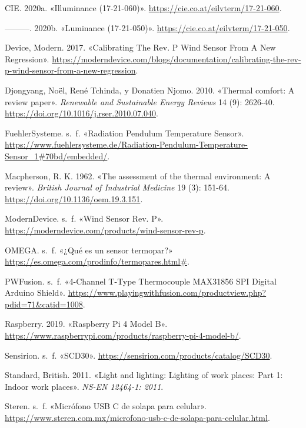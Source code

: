 \documentclass[
  letterpaper,
]{scrbook}
\newlength{\cslhangindent}
\newenvironment{CSLReferences}[2] %
 {\begin{list}{}{%
  \setlength{\itemindent}{0pt}
  \setlength{\leftmargin}{0pt}
  \setlength{\parsep}{0pt}
  \ifodd #1
   \setlength{\leftmargin}{\cslhangindent}
   \setlength{\itemindent}{-1\cslhangindent}
  \fi
  \setlength{\itemsep}{#2\baselineskip}}}
 {\end{list}}
\begin{document}
\begin{CSLReferences}{1}{0}
CIE. 2020a. {«Illuminance (17-21-060)»}.
\url{https://cie.co.at/eilvterm/17-21-060}.

---------. 2020b. {«Luminance (17-21-050)»}.
\url{https://cie.co.at/eilvterm/17-21-050}.

Device, Modern. 2017. {«Calibrating The Rev. P Wind Sensor From A New
Regression»}.
\url{https://moderndevice.com/blogs/documentation/calibrating-the-rev-p-wind-sensor-from-a-new-regression}.

Djongyang, Noël, René Tchinda, y Donatien Njomo. 2010. {«Thermal
comfort: A review paper»}. \emph{Renewable and Sustainable Energy
Reviews} 14 (9): 2626-40.
\url{https://doi.org/10.1016/j.rser.2010.07.040}.

FuehlerSysteme. s.~f. {«Radiation Pendulum Temperature Sensor»}.
\url{https://www.fuehlersysteme.de/Radiation-Pendulum-Temperature-Sensor_1\#70bd/embedded/}.

Macpherson, R. K. 1962. {«The assessment of the thermal environment: A
review»}. \emph{British Journal of Industrial Medicine} 19 (3): 151-64.
\url{https://doi.org/10.1136/oem.19.3.151}.

ModernDevice. s.~f. {«Wind Sensor Rev. P»}.
\url{https://moderndevice.com/products/wind-sensor-rev-p}.

OMEGA. s.~f. {«¿Qué es un sensor termopar?»}
\url{https://es.omega.com/prodinfo/termopares.html\#}.

PWFusion. s.~f. {«4-Channel T-Type Thermocouple MAX31856 SPI Digital
Arduino Shield»}.
\url{https://www.playingwithfusion.com/productview.php?pdid=71&catid=1008}.

Raspberry. 2019. {«Raspberry Pi 4 Model B»}.
\url{https://www.raspberrypi.com/products/raspberry-pi-4-model-b/}.

Sensirion. s.~f. {«SCD30»}.
\url{https://sensirion.com/products/catalog/SCD30}.

Standard, British. 2011. {«Light and lighting: Lighting of work places:
Part 1: Indoor work places»}. \emph{NS-EN 12464-1: 2011}.

Steren. s.~f. {«Micrófono USB C de solapa para celular»}.
\url{https://www.steren.com.mx/microfono-usb-c-de-solapa-para-celular.html}.


\end{CSLReferences}
\end{document}
